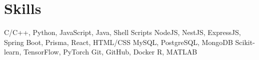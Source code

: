 \section{\textbf{Skills}}
\vspace{-0.4mm}
 \resumeHeadingSkillStart
    {C/C++, Python, JavaScript, Java, Shell Scripts}
    {NodeJS, NestJS, ExpressJS, Spring Boot, Prisma, React, HTML/CSS}
    {MySQL, PostgreSQL, MongoDB}
    {Scikit-learn, TensorFlow, PyTorch}
    {Git, GitHub, Docker}
    {R, MATLAB}
 \resumeHeadingSkillEnd
 
\vspace{-6mm}
 